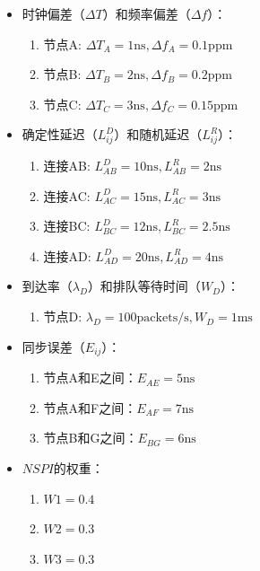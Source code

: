 \documentclass[UTF8,a4paper,12pt]{ctexart}
\numberwithin{equation}{section}
\begin{document}
	\begin{itemize}
		\item 时钟偏差（$\Delta T$）和频率偏差（$\Delta f$）：
		\begin{enumerate}
			\item 节点A: $\Delta T_A = 1 \text{ns}, \Delta f_A = 0.1 \text{ppm}$
			\item 节点B: $\Delta T_B = 2 \text{ns}, \Delta f_B = 0.2 \text{ppm}$
			\item 节点C: $\Delta T_C = 3 \text{ns}, \Delta f_C = 0.15 \text{ppm}$
		\end{enumerate}
		
		\item 确定性延迟（$L_{ij}^D$）和随机延迟（$L_{ij}^R$）：
		\begin{enumerate}
			\item 连接AB: $L_{AB}^D = 10 \text{ns}, L_{AB}^R = 2 \text{ns}$
			\item 连接AC: $L_{AC}^D = 15 \text{ns}, L_{AC}^R = 3 \text{ns}$
			\item 连接BC: $L_{BC}^D = 12 \text{ns}, L_{BC}^R = 2.5 \text{ns}$
			\item 连接AD: $L_{AD}^D = 20 \text{ns}, L_{AD}^R = 4 \text{ns}$
		\end{enumerate}
		
		\item 到达率（$\lambda_D$）和排队等待时间（$W_D$）：
		\begin{enumerate}
			\item 节点D: $\lambda_D = 100 \text{packets/s}, W_D = 1 \text{ms}$
		\end{enumerate}
		
		\item 同步误差（$E_{ij}$）：
		\begin{enumerate}
			\item 节点A和E之间：$E_{AE} = 5 \text{ns}$
			\item 节点A和F之间：$E_{AF} = 7 \text{ns}$
			\item 节点B和G之间：$E_{BG} = 6 \text{ns}$
		\end{enumerate}
		
		\item $NSPI$的权重：
		\begin{enumerate}
			\item $W1 = 0.4$
			\item $W2 = 0.3$
			\item $W3 = 0.3$
		\end{enumerate}
	\end{itemize}
	
\end{document}
